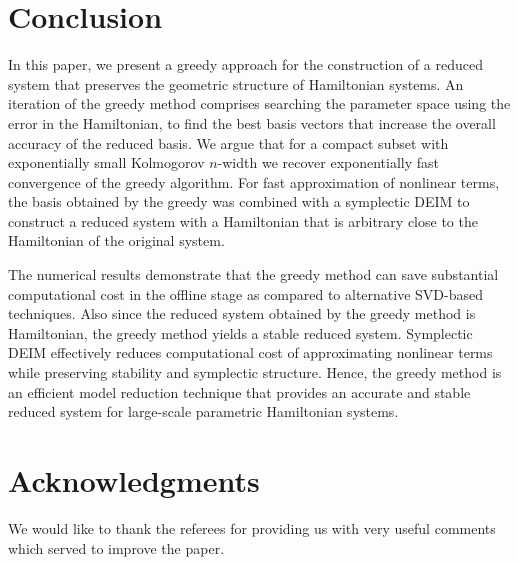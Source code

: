 \documentclass[final]{siamart}
\begin{document}
\section{Conclusion} \label{chap:Con:1}

In this paper, we present a greedy approach for the construction of a reduced system that preserves the geometric structure of Hamiltonian systems. An iteration of the greedy method comprises searching the parameter space using the error in the Hamiltonian, to find the best basis vectors that increase the overall accuracy of the reduced basis. We argue that for a compact subset with exponentially small Kolmogorov $n$-width we recover exponentially fast convergence of the greedy algorithm. For fast approximation of nonlinear terms, the basis obtained by the greedy was combined with a symplectic DEIM to construct {{\color{black}} a reduced system with a Hamiltonian that is arbitrary close to the Hamiltonian of the original system.}

The numerical results demonstrate that the greedy method can save substantial computational cost in the offline stage as compared to alternative SVD-based techniques. Also since the reduced system obtained by the greedy method is Hamiltonian, the greedy method yields a stable reduced system. Symplectic DEIM effectively reduces computational cost of approximating nonlinear terms while preserving stability and symplectic structure. Hence, the greedy method is an efficient model reduction technique that provides an accurate and stable reduced system for large-scale parametric Hamiltonian systems.

 

\section*{Acknowledgments}
{{\color{black}} We would like to thank the referees for providing us with very useful comments which served to improve the paper.}



\end{document}
